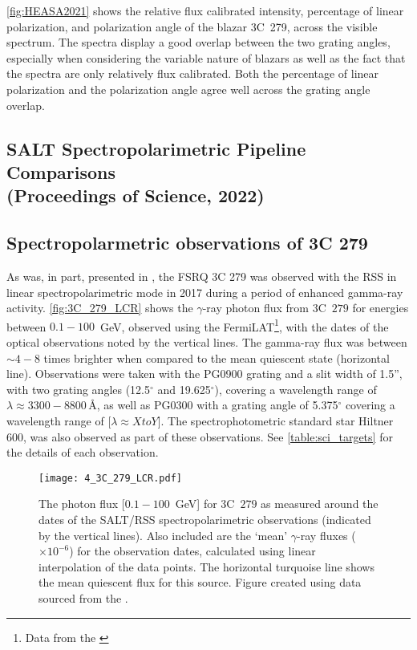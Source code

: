 \autoref{fig:HEASA2021} shows the relative flux calibrated intensity, percentage of linear polarization, and polarization angle of the blazar 3C~279, across the visible spectrum.
The spectra display a good overlap between the two grating angles, especially when considering the variable nature of blazars as well as the fact that the spectra are only relatively flux calibrated.
Both the percentage of linear polarization and the polarization angle agree well across the grating angle overlap.

\subsection[Proceeding, HEASA (2022)]{%
    \gls{SALT} Spectropolarimetric Pipeline Comparisons\\
    (Proceedings of Science,  2022)
}


\subsection{Spectropolarmetric observations of 3C 279}

As was, in part, presented in  \citet[][see also \autoref{app:papers}]{Cooper_HEASA2022}, the FSRQ 3C 279 was observed with the RSS in linear spectropolarimetric mode in 2017 during a period of enhanced gamma-ray activity. \autoref{fig:3C_279_LCR} shows the $\gamma$-ray photon flux from 3C~$279$ for energies between $0.1 - 100$~GeV, observed using the \gls{FermiLAT}\footnote{Data from the  \citep{FermiLCR}}, with the dates of the optical observations noted by the vertical lines.  The gamma-ray flux was between $\sim4 - 8$ times brighter when compared to the mean quiescent state (horizontal line). Observations were taken with the PG0900 grating and a slit width of 1.5'', with two grating angles (12.5$^\circ$ and 19.625$^\circ$), covering a wavelength range of $\lambda \approx 3300 - 8800$\,\AA{}, as well as PG0300 with a grating angle of 5.375$^\circ$ covering a wavelength range of [$\lambda \approx X to Y$]. The spectrophotometric standard star Hiltner~$600$, was also observed as part of these observations.
See \autoref{table:sci_targets} for the details of each observation.

\begin{figure}[t]
    \centering
    \texttt{[image: 4\_3C\_279\_LCR.pdf]}
    \caption{The  photon flux [$0.1 - 100$~GeV] for 3C~$279$ as measured around the dates of the \gls{SALT}/\gls{RSS} spectropolarimetric observations (indicated by the vertical lines). Also included are the `mean' $\gamma$-ray fluxes ($\times 10^{-6}$) for the observation dates, calculated using linear interpolation of the  data points. The horizontal turquoise line shows the mean quiescent flux for this source. Figure created using data sourced from the .\protect\footnotemark}
    \label{fig:3C_279_LCR}
\end{figure}


